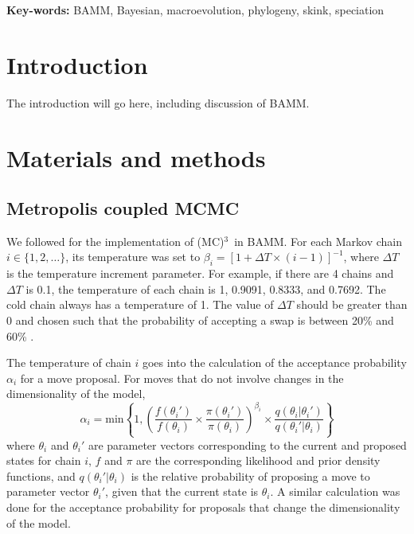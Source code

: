 \documentclass[12pt]{article}
\newcommand{\MCMCMC}{(MC)$^{3}$}
\begin{document}
\begin{flushleft}
\textbf{Key-words:} BAMM, Bayesian, macroevolution, phylogeny, skink, speciation
\end{flushleft}


\pagebreak[4]


\section*{Introduction}

The introduction will go here, including discussion of BAMM.


\section*{Materials and methods}

\subsection*{Metropolis coupled MCMC}

We followed \citet{alt04} for the implementation of \MCMCMC\ in BAMM.
%
For each Markov chain $i \in \{1, 2, \dots\}$, its temperature was set to
$\beta_i = [1 + \Delta T \times (i - 1)]^{-1}$,
where $\Delta T$ is the temperature increment parameter.
%
For example, if there are 4 chains and $\Delta T$ is 0.1,
the temperature of each chain is 1, 0.9091, 0.8333, and 0.7692.
%
The cold chain always has a temperature of 1.
%
The value of $\Delta T$ should be greater than 0
and chosen such that the probability of accepting a swap
is between 20\% and 60\% \citep{alt04}.


The temperature of chain $i$ goes into the calculation
of the acceptance probability $\alpha_i$ for a move proposal.
%
For moves that do not involve changes in the dimensionality of the model,
\[\alpha_i = \text{min}\left\{ 1,
    \left(
    \frac{f(\theta_i')}{f(\theta_i)} \times
    \frac{\pi(\theta_i')}{\pi(\theta_i)}
    \right)^{\beta_i} \times
    \frac{q(\theta_i | \theta_i')}{q(\theta_i' | \theta_i)}
\right\}\]
where $\theta_i$ and $\theta_i'$ are parameter vectors
corresponding to the current and proposed states for chain $i$,
$f$ and $\pi$ are the corresponding likelihood and prior density functions,
and $q(\theta_i' | \theta_i)$ is the relative probability
of proposing a move to parameter vector $\theta_i'$,
given that the current state is $\theta_i$.
%
A similar calculation was done for the acceptance probability for proposals
that change the dimensionality of the model.
\end{document}
